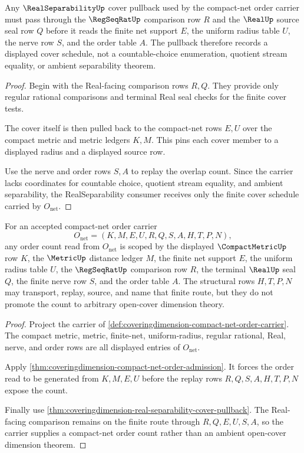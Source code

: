 \begin{theorem}
\label{thm:coveringdimension-real-separability-cover-pullback}
Any $\RealSeparabilityUp$ cover pullback used by the compact-net order carrier
must pass through the $\RegSeqRatUp$ comparison row $R$ and the $\RealUp$ source
seal row $Q$ before it reads the finite net support $E$, the uniform radius
table $U$, the nerve row $S$, and the order table $A$. The pullback therefore
records a displayed cover schedule, not a countable-choice enumeration,
quotient stream equality, or ambient separability theorem.
\end{theorem}
\begin{proof}
Begin with the Real-facing comparison rows $R,Q$. They provide only regular
rational comparisons and terminal Real seal checks for the finite cover tests.

The cover itself is then pulled back to the compact-net rows $E,U$ over the
compact metric and metric ledgers $K,M$. This pins each cover member to a
displayed radius and a displayed source row.

Use the nerve and order rows $S,A$ to replay the overlap count. Since the
carrier lacks coordinates for countable choice, quotient stream equality, and
ambient separability, the RealSeparability consumer receives only the finite
cover schedule carried by $O_{\mathrm{net}}$.
\end{proof}

\begin{theorem}
\label{thm:covering-dimension-compact-net-order-scope}
For an accepted compact-net order carrier
$$
O_{\mathrm{net}}=(K,M,E,U,R,Q,S,A,H,T,P,N),
$$
any order count read from $O_{\mathrm{net}}$ is scoped by the displayed $\CompactMetricUp$ row $K$, the $\MetricUp$ distance ledger $M$, the finite net support $E$, the uniform radius table $U$, the $\RegSeqRatUp$ comparison row $R$, the terminal $\RealUp$ seal $Q$, the finite nerve row $S$, and the order table $A$. The structural rows $H,T,P,N$ may transport, replay, source, and name that finite route, but they do not promote the count to arbitrary open-cover dimension theory.
\end{theorem}
\begin{proof}
Project the carrier of \autoref{def:coveringdimension-compact-net-order-carrier}. The compact metric, metric, finite-net, uniform-radius, regular rational, Real, nerve, and order rows are all displayed entries of $O_{\mathrm{net}}$.

Apply \autoref{thm:coveringdimension-compact-net-order-admission}. It forces the order read to be generated from $K,M,E,U$ before the replay rows $R,Q,S,A,H,T,P,N$ expose the count.

Finally use \autoref{thm:coveringdimension-real-separability-cover-pullback}. The Real-facing comparison remains on the finite route through $R,Q,E,U,S,A$, so the carrier supplies a compact-net order count rather than an ambient open-cover dimension theorem.
\end{proof}
